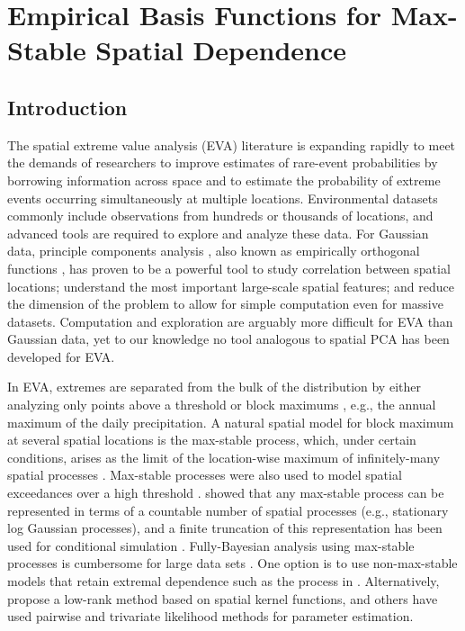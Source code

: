 \chapter{Empirical Basis Functions for Max-Stable Spatial Dependence}
\label{chap:four}

\section{Introduction}\label{ebs:intro}

The spatial extreme value analysis (EVA) literature is expanding rapidly \citep{Davison2012} to meet the demands of researchers to improve estimates of rare-event probabilities by borrowing information across space and to estimate the probability of extreme events occurring simultaneously at multiple locations.
Environmental datasets commonly include observations from hundreds or thousands of locations, and advanced tools are required to explore and analyze these data.
For Gaussian data, principle components analysis \citep[PCA]{Everitt2008}, also known as empirically orthogonal functions \citep[EOF]{Toggweiler2001}, has proven to be a powerful tool to study correlation between spatial locations; understand the most important large-scale spatial features; and reduce the dimension of the problem to allow for simple computation even for massive datasets.
Computation and exploration are arguably more difficult for EVA than Gaussian data, yet to our knowledge no tool analogous to spatial PCA has been developed for EVA.

In EVA, extremes are separated from the bulk of the distribution by either analyzing only points above a threshold or block maximums \citep{Coles2001}, e.g., the annual maximum of the daily precipitation.
A natural spatial model for block maximum at several spatial locations is the max-stable process, which, under certain conditions, arises as the limit of the location-wise maximum of infinitely-many spatial processes \citep{deHaan2006}.
Max-stable processes were also used to model spatial exceedances over a high threshold \citep{Thibaud2013,Huser2014}.
 showed that any max-stable process can be represented in terms of a countable number of spatial processes (e.g., stationary log Gaussian processes), and a finite truncation of this representation has been used for conditional simulation \citep{Wang2011}.
Fully-Bayesian analysis using max-stable processes is cumbersome for large data sets \citep{Wadsworth2014,Thibaud2013a}.
One option is to use non-max-stable models that retain extremal dependence such as the \skewt{} process in \citep{Morris2016}.
Alternatively, \citet{Reich2012} propose a low-rank method based on spatial kernel functions, and others have used pairwise \citep{Padoan2010,Huser2014} and trivariate \citep{Genton2011} likelihood methods for parameter estimation.


